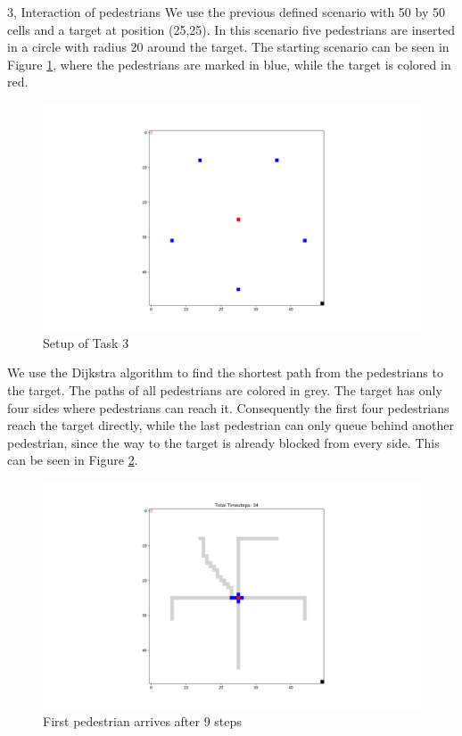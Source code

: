 \documentclass[10pt,a4paper]{article}
\begin{document}
\begin{task}{3, Interaction of pedestrians}
We use the previous defined scenario with 50 by 50 cells and a target at position (25,25). In this scenario five pedestrians are inserted in a circle with radius 20 around the target. The starting scenario can be seen in Figure \ref{fig:start_3}, where the pedestrians are marked in blue, while the target is colored in red.
\begin{figure}[h!]
    \centering
    \includegraphics[width=\textwidth]{pictures/Task3_start.png}
    \caption{Setup of Task 3}
    \label{fig:start_3}
\end{figure}
We use the Dijkstra algorithm to find the shortest path from the pedestrians to the target. The paths of all pedestrians are colored in grey. The target has only four sides where pedestrians can reach it. Consequently the first four pedestrians reach the target directly, while the last pedestrian can only queue behind another pedestrian, since the way to the target is already blocked from every side. This can be seen in Figure \ref{fig:3_end}.
\begin{figure}[h!]
    \centering
    \includegraphics[width=\textwidth]{pictures/Task3_end.png}
    \caption{First pedestrian arrives after 9 steps}
    \label{fig:3_end}
\end{figure}
\end{task}
\end{document}
